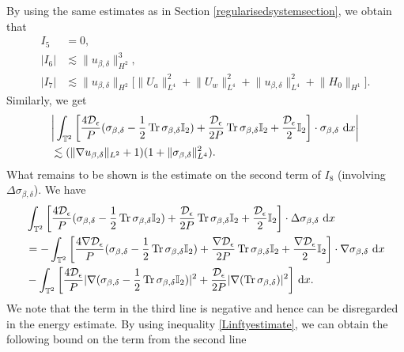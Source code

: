 \documentclass[12pt,a4paper]{article}
\theoremstyle{definition}
\theoremstyle{remark}
\numberwithin{equation}{section}
\newcommand{\dx}{\ {\rm d} {x}}
\DeclareMathOperator{\Tr}{Tr}
\begin{document}
By using the same estimates as in Section \ref{regularisedsystemsection}, we obtain that
\begin{align*}
I_5 &= 0, \\
\lvert I_6 \rvert &\lesssim \lVert u_{\beta,\delta} \rVert_{H^2}^3, \\
\lvert I_7 \rvert &\lesssim \lVert u_{\beta,\delta} \rVert_{H^2} \bigg[ \lVert U_a \rVert_{L^4}^2 + \lVert U_w \rVert_{L^4}^2 + \lVert u_{\beta,\delta} \rVert_{L^4}^2 + \lVert H_0 \rVert_{H^1} \bigg].
\end{align*}
Similarly, we get
\begin{align*}
&\bigg\lvert \int_{\mathbb{T}^2} \bigg[ \frac{4 \mathcal{D}_\epsilon}{P} (\sigma_{\beta,\delta} - \frac{1}{2} \Tr \sigma_{\beta,\delta} \mathbb I_2) + \frac{\mathcal{D}_\epsilon}{2 P} \Tr \sigma_{\beta,\delta} \mathbb I_2 + \frac{\mathcal{D}_\epsilon}{2} \mathbb I_2 \bigg] \cdot \sigma_{\beta,\delta} \dx \bigg\rvert \\
&\lesssim (\lVert \nabla u_{\beta,\delta} \rVert_{L^2} + 1) (1 + \lVert \sigma_{\beta,\delta} \rVert_{L^4}^2).
\end{align*}
What remains to be shown is the estimate on the second term of $I_8$ (involving $\Delta \sigma_{\beta,\delta}$). We have
\begin{align*}
&\int_{\mathbb{T}^2} \bigg[ \frac{4 \mathcal{D}_\epsilon}{P} (\sigma_{\beta,\delta} - \frac{1}{2} \Tr \sigma_{\beta,\delta} \mathbb I_2) + \frac{\mathcal{D}_\epsilon}{2 P} \Tr \sigma_{\beta,\delta} \mathbb I_2 + \frac{\mathcal{D}_\epsilon}{2} \mathbb I_2 \bigg] \cdot \Delta \sigma_{\beta,\delta} \dx \\
&= - \int_{\mathbb{T}^2} \bigg[ \frac{4 \nabla \mathcal{D}_\epsilon}{P} (\sigma_{\beta,\delta} - \frac{1}{2} \Tr \sigma_{\beta,\delta} \mathbb I_2) + \frac{\nabla \mathcal{D}_\epsilon}{2 P} \Tr \sigma_{\beta,\delta} \mathbb I_2  + \frac{\nabla \mathcal{D}_\epsilon}{2} \mathbb I_2 \bigg] \cdot \nabla \sigma_{\beta,\delta} \dx \\
&- \int_{\mathbb{T}^2} \bigg[ \frac{4 \mathcal{D}_\epsilon}{P} \lvert \nabla (\sigma_{\beta,\delta} - \frac{1}{2} \Tr \sigma_{\beta,\delta} \mathbb I_2 ) \rvert^2 + \frac{\mathcal{D}_\epsilon}{2 P} \lvert \nabla (\Tr \sigma_{\beta,\delta} ) \rvert^2 \bigg] \dx.
\end{align*}
We note that the term in the third line is negative and hence can be disregarded in the energy estimate. By using inequality \eqref{Linftyestimate}, we can obtain the following bound on the term from the second line
\end{document}
